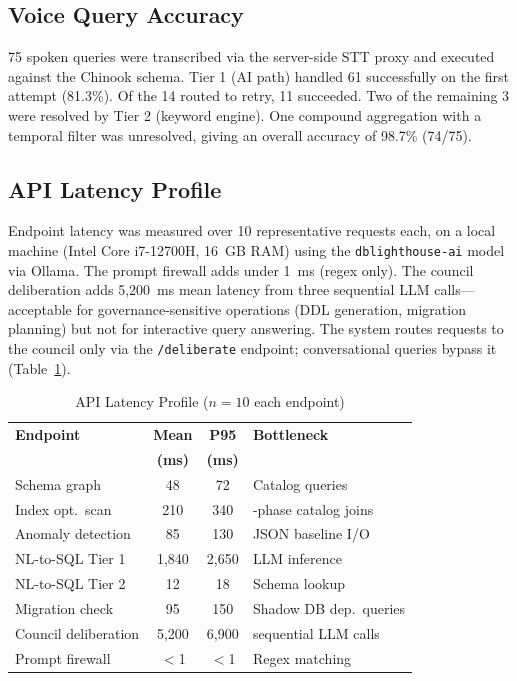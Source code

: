 \documentclass[conference]{IEEEtran}
\begin{document}
\subsection{Voice Query Accuracy}

75 spoken queries were transcribed via the server-side STT proxy and
executed against the Chinook schema. Tier 1 (AI path) handled 61
successfully on the first attempt (81.3\%). Of the 14 routed to retry,
11 succeeded. Two of the remaining 3 were resolved by Tier 2 (keyword
engine). One compound aggregation with a temporal filter was unresolved,
giving an overall accuracy of 98.7\% (74/75).

\subsection{API Latency Profile}
\label{sec:latency}

Endpoint latency was measured over 10 representative requests each, on a
local machine (Intel Core i7-12700H, 16~GB RAM) using the
\texttt{dblighthouse-ai} model via Ollama. The prompt firewall adds under
1~ms (regex only). The council deliberation adds 5,200~ms mean latency
from three sequential LLM calls---acceptable for governance-sensitive
operations (DDL generation, migration planning) but not for interactive
query answering. The system routes requests to the council only via the
\texttt{/deliberate} endpoint; conversational queries bypass it
(Table~\ref{tab:latency}).

\begin{table}[htbp]
\caption{API Latency Profile ($n=10$ each endpoint)}
\label{tab:latency}
\begin{tabular}{>{\raggedright}p{2.2cm} c c >{\raggedright\arraybackslash}p{1.8cm}}
\toprule
\textbf{Endpoint} & \textbf{Mean} & \textbf{P95} & \textbf{Bottleneck} \\
 & \textbf{(ms)} & \textbf{(ms)} & \\
\midrule
Schema graph & 48 & 72 & Catalog queries \\
Index opt.\ scan & 210 & 340 & 3-phase catalog joins \\
Anomaly detection & 85 & 130 & JSON baseline I/O \\
NL-to-SQL Tier 1 & 1,840 & 2,650 & LLM inference \\
NL-to-SQL Tier 2 & 12 & 18 & Schema lookup \\
Migration check & 95 & 150 & Shadow DB dep.\ queries \\
Council deliberation & 5,200 & 6,900 & 3 sequential LLM calls \\
Prompt firewall & $<$1 & $<$1 & Regex matching \\
\bottomrule
\end{tabular}
\end{table}
\end{document}
